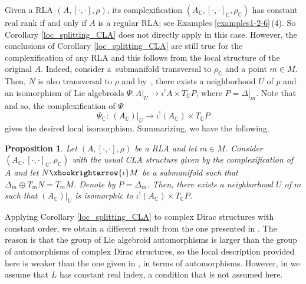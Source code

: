 \documentclass[pdftex]{sigma}
\numberwithin{equation}{section}
\newtheorem{Proposition}[Theorem]{Proposition}
 { \theoremstyle{definition}
\newtheorem{Definition}[Theorem]{Definition}
\newtheorem{Note}[Theorem]{Note}
\newtheorem{Example}[Theorem]{Example}
\newtheorem{Examples}[Theorem]{Examples}
\newtheorem{Remark}[Theorem]{Remark} }
\newcommand{\C}{{\mathbb{C}}}
\begin{document}
Given a RLA $(A, [\cdot, \cdot], \rho)$, its complexification $(A_{\C}, [\cdot, \cdot]_{\C}, \rho_{\C})$ has constant real rank if and only if $A$ is a regular RLA; see Examples \ref{examples1-2-6}\,(4). So Corollary \ref{loc_splitting_CLA} does not directly apply in this case. However, the conclusions of Corollary \ref{loc_splitting_CLA} are still true for the complexification of any RLA and this follows from the local structure of the original $A$. Indeed, consider a~submanifold  transversal to $\rho_{\C}$ and a point $m\in M$. Then, $N$ is also transversal to $\rho$ and by~\mbox{\cite[Corollary 4.2]{bursztyn2019splitting}}, there exists a neighborhood $U$ of $p$ and an isomorphism of Lie algebroids $\Psi\colon A|_U\to \iota^! A\times T_{\C}P$, where $P=\Delta|_m$. Note that \smash{$\bigl(\iota^! A\bigr)_{\C}=\iota^!(A_{\C})$} and so, the complexification of $\Psi$
\[\Psi_{\C}\colon\ (A_{\C})|_U\to \iota^!(A_{\C})\times T_{\C}P\]
gives the desired local isomorphism. Summarizing, we have the following.

 \begin{Proposition}
Let $(A,[\cdot,\cdot],\rho)$ be a RLA and let $m\in M$. Consider $(A_{\C},[\cdot,\cdot]_{\C},\rho_{\C})$ with the usual CLA structure given by the complexification of $A$ and let $N\xhookrightarrow{\iota}M$ be a submanifold such that $\Delta_{m}\oplus T_m N=T_m M$. Denote by $P=\Delta_{m}$. Then, there exists a neighborhood $U$ of $m$ such that $(A_{\C})|_{U}$ is isomorphic to $\iota^! (A_{\C})\times T_{\C}P$.
\end{Proposition}

\begin{Remark}
Applying Corollary \ref{loc_splitting_CLA} to complex Dirac structures with constant order, we obtain a different result from the one presented in \cite{aguero2022complex}.
The reason is that the group of Lie algebroid automorphisms is larger than the group of automorphisms of complex Dirac structures, so the local description provided here is weaker than the one given in \cite{aguero2022complex}, in terms of automorphisms. However, in \cite{aguero2022complex} we assume that $L$ has constant real index, a condition that is not assumed here.
\end{Remark}
\end{document}
